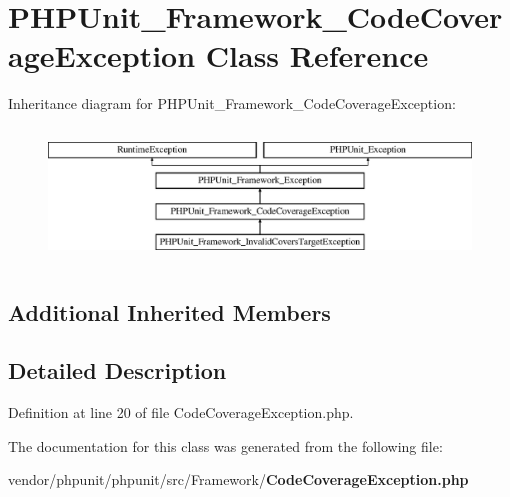 \section{P\+H\+P\+Unit\+\_\+\+Framework\+\_\+\+Code\+Coverage\+Exception Class Reference}
\label{class_p_h_p_unit___framework___code_coverage_exception}
Inheritance diagram for P\+H\+P\+Unit\+\_\+\+Framework\+\_\+\+Code\+Coverage\+Exception\+:\begin{figure}[H]
\begin{center}
\leavevmode
\includegraphics[height=3.589744cm]{class_p_h_p_unit___framework___code_coverage_exception}
\end{center}
\end{figure}
\subsection*{Additional Inherited Members}


\subsection{Detailed Description}


Definition at line 20 of file Code\+Coverage\+Exception.\+php.



The documentation for this class was generated from the following file\+:\begin{DoxyCompactItemize}
\item 
vendor/phpunit/phpunit/src/\+Framework/{\bf Code\+Coverage\+Exception.\+php}\end{DoxyCompactItemize}
